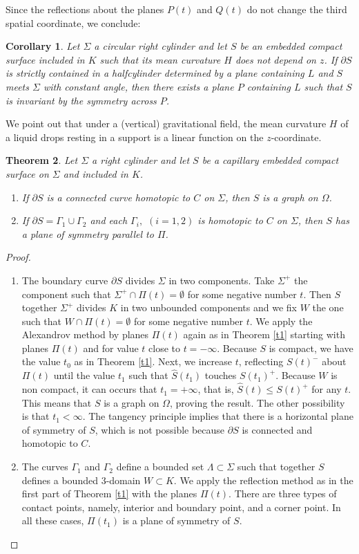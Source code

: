 \documentclass[12pt,a4paper]{amsart}
\newtheorem{theorem}{Theorem}
\newtheorem{corollary}[theorem]{Corollary}
\begin{document}
Since the reflections about the planes $P(t)$ and $Q(t)$ do not change the third spatial coordinate, we conclude:
\begin{corollary} Let $\Sigma$ a circular right cylinder and let $S$ be an embedded compact surface included in $K$ such that its mean curvature $H$ does not depend on $z$. If $\partial S$ is strictly contained in a halfcylinder determined by a plane containing $L$ and $S$ meets $\Sigma$ with constant angle, then there exists a plane $P$ containing $L$ such that $S$ is invariant by the symmetry across $P$.
\end{corollary}
We point out that under a (vertical) gravitational field, the mean curvature $H$ of a liquid drops resting in a support is a linear function on the $z$-coordinate.
\begin{theorem}\label{T2} Let $\Sigma$ a right cylinder and let $S$ be a capillary embedded compact surface on $\Sigma$ and included in $K$.
\begin{enumerate}
\item If $\partial S$ is a connected curve homotopic to $C$ on $\Sigma$, then $S$ is a graph on $\Omega$.
\item If $\partial S=\Gamma_1\cup\Gamma_2$ and each $\Gamma_{i},$ $(i=1,2)$ is homotopic to $C$ on $\Sigma$, then $S$ has a plane of symmetry parallel to $\Pi$.
\end{enumerate}
\end{theorem}
\begin{proof}
\begin{enumerate}
\item The boundary curve $\partial S$ divides $\Sigma$ in two components. Take $\Sigma^{+}$ the component such that $\Sigma^+\cap \Pi(t)=\emptyset$ for some negative number $t$. Then
$S$ together $\Sigma^{+}$ divides $K$ in two unbounded components and we fix $W$ the one such that $W\cap \Pi(t)=\emptyset$ for some negative number $t$. We apply the Alexandrov method by planes $\Pi(t)$ again as in Theorem \ref{t1} starting with planes $\Pi(t)$ and for value $t$ close to $t=-\infty$. Because $S$ is compact, we have the value $t_0$ as in Theorem \ref{t1}. Next, we increase $t$, reflecting $S(t)^{-}$ about $\Pi(t)$ until the value $t_1$ such that $\hat{S}(t_1)$ touches $S(t_1)^+$. Because $W$ is non compact, it can occurs that $t_1=+\infty$, that is, $\hat{S}(t)\leq S(t)^+$ for any $t$. This means that $S$ is a graph on $\Omega$, proving the result. The other possibility is that $t_1<\infty$. The tangency principle implies that there is a horizontal plane of symmetry of $S$, which is not possible because $\partial S$ is connected and homotopic to $C$.
\item The curves $\Gamma_1$ and $\Gamma_2$ define a bounded set $\Lambda\subset \Sigma$ such that together $S$ defines a bounded $3$-domain $W\subset K$. We apply the reflection method as in the first part of Theorem \ref{t1} with the planes $\Pi(t)$. There are three types of contact points, namely, interior and boundary point, and a corner point. In all these cases, $\Pi(t_1)$ is a plane of symmetry of $S$.
\end{enumerate}
\end{proof}
\end{document}
